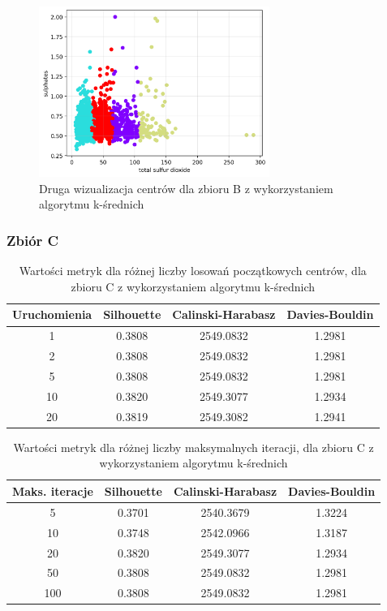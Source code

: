 \documentclass[a4paper,11pt]{article}
\begin{document}
\begin{figure}[H]
    \centering
    \includegraphics[width=0.67\textwidth]{images2/kmeans/Kmeans_Wines_2.png}
    \caption{Druga wizualizacja centrów dla zbioru B z wykorzystaniem algorytmu k-średnich}
    \label{tab:km_b_wis_2}
\end{figure}

\subsubsection*{Zbiór C}

\begin{table}[H]
    \centering
    \begin{tabular}{|c|c|c|c|}
    \hline
    \textbf{Uruchomienia} & \textbf{Silhouette} & \textbf{Calinski-Harabasz} & \textbf{Davies-Bouldin} \\ \hline
    1  & 0.3808 & 2549.0832 & 1.2981 \\ \hline
    2  & 0.3808 & 2549.0832 & 1.2981 \\ \hline
    5  & 0.3808 & 2549.0832 & 1.2981 \\ \hline
    10 & 0.3820 & 2549.3077 & 1.2934 \\ \hline
    20 & 0.3819 & 2549.3082 & 1.2941 \\ \hline
    \end{tabular}
    \caption{Wartości metryk dla różnej liczby losowań początkowych centrów, dla zbioru C z wykorzystaniem algorytmu k-średnich}
    \label{tab:km_c_1}
\end{table}

\begin{table}[H]
    \centering
    \begin{tabular}{|c|c|c|c|}
    \hline
    \textbf{Maks. iteracje} & \textbf{Silhouette} & \textbf{Calinski-Harabasz} & \textbf{Davies-Bouldin} \\ \hline
    5   & 0.3701 & 2540.3679 & 1.3224 \\ \hline
    10  & 0.3748 & 2542.0966 & 1.3187 \\ \hline
    20  & 0.3820 & 2549.3077 & 1.2934 \\ \hline
    50  & 0.3808 & 2549.0832 & 1.2981 \\ \hline
    100 & 0.3808 & 2549.0832 & 1.2981 \\ \hline
    \end{tabular}
    \caption{Wartości metryk dla różnej liczby maksymalnych iteracji, dla zbioru C z wykorzystaniem algorytmu k-średnich}
    \label{tab:km_c_2}
\end{table}
\end{document}
